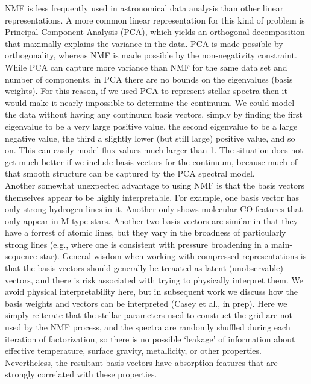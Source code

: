 \documentclass[modern]{aastex631}
\begin{document}
NMF is less frequently used in astronomical data analysis than other linear representations. A more common linear representation for this kind of problem is Principal Component Analysis (PCA), which yields an orthogonal decomposition that maximally explains the variance in the data. PCA is made possible by orthogonality, whereas NMF is made possible by the non-negativity constraint. While PCA can capture more variance than NMF for the same data set and number of components, in PCA there are no bounds on the eigenvalues (basis weights). For this reason, if we used PCA to represent stellar spectra then it would make it nearly impossible to determine the continuum. We could model the data without having any continuum basis vectors, simply by finding the first eigenvalue to be a very large positive value, the second eigenvalue to be a large negative value, the third a slightly lower (but still large) positive value, and so on. This can easily model flux values much larger than 1. The situation does not get much better if we include basis vectors for the continuum, because much of that smooth structure can be captured by the PCA spectral model.\\

Another somewhat unexpected advantage to using NMF is that the basis vectors themselves appear to be highly interpretable. For example, one basis vector has only strong hydrogen lines in it. Another only shows molecular CO features that only appear in M-type stars. Another two basis vectors are similar in that they have a forrest of atomic lines, but they vary in the broadness of particularly strong lines (e.g., where one is consistent with pressure broadening in a main-sequence star). General wisdom when working with compressed representations is that the basis vectors should generally be treaated as latent (unobservable) vectors, and there is risk associated with trying to physically interpret them. We avoid physical interpretability here, but in subsequent work we discuss how the basis weights and vectors can be interpreted (Casey et al., in prep). Here we simply reiterate that the stellar parameters used to construct the grid are not used by the NMF process, and the spectra are randomly shuffled during each iteration of factorization, so there is no possible `leakage' of information about effective temperature, surface gravity, metallicity, or other properties. Nevertheless, the resultant basis vectors have absorption features that are strongly correlated with these properties. \\
\end{document}
